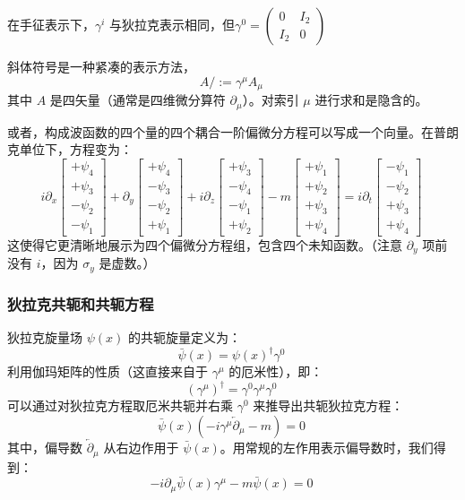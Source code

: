 在手征表示下，\( \gamma^i \) 与狄拉克表示相同，但\(\gamma^0 = \begin{pmatrix} 0 & I_2 \\ I_2 & 0 \end{pmatrix}\)

斜体符号是一种紧凑的表示方法，
\[
A\!\!\!/ := \gamma^\mu A_\mu~
\]
其中 \( A \) 是四矢量（通常是四维微分算符 \( \partial_\mu \)）。对索引 \( \mu \) 进行求和是隐含的。

或者，构成波函数的四个量的四个耦合一阶偏微分方程可以写成一个向量。在普朗克单位下，方程变为：
\[
i \partial_x \begin{bmatrix} +\psi_4 \\ +\psi_3 \\ -\psi_2 \\ -\psi_1 \end{bmatrix}
+ \partial_y \begin{bmatrix} +\psi_4 \\ -\psi_3 \\ -\psi_2 \\ +\psi_1 \end{bmatrix}
+ i \partial_z \begin{bmatrix} +\psi_3 \\ -\psi_4 \\ -\psi_1 \\ +\psi_2 \end{bmatrix}
- m \begin{bmatrix} +\psi_1 \\ +\psi_2 \\ +\psi_3 \\ +\psi_4 \end{bmatrix}
= i \partial_t \begin{bmatrix} -\psi_1 \\ -\psi_2 \\ +\psi_3 \\ +\psi_4 \end{bmatrix}~
\]
这使得它更清晰地展示为四个偏微分方程组，包含四个未知函数。（注意 \(\partial_y \) 项前没有 \( i \)，因为 \( \sigma_y \) 是虚数。）
\subsubsection{狄拉克共轭和共轭方程}

狄拉克旋量场 \( \psi(x) \) 的共轭旋量定义为：
\[
\bar{\psi}(x) = \psi(x)^\dagger \gamma^0~
\]
利用伽玛矩阵的性质（这直接来自于 \( \gamma^\mu \) 的厄米性），即：
\[
(\gamma^\mu)^\dagger = \gamma^0 \gamma^\mu \gamma^0~
\]
可以通过对狄拉克方程取厄米共轭并右乘 \( \gamma^0 \) 来推导出共轭狄拉克方程：
\[
\bar{\psi}(x)(-i \gamma^\mu {\overleftarrow \partial}_\mu - m) = 0~
\]
其中，偏导数 \( {\overleftarrow \partial}_\mu \) 从右边作用于 \( \bar{\psi}(x) \)。用常规的左作用表示偏导数时，我们得到：
\[
-i \partial_\mu \bar{\psi}(x) \gamma^\mu - m \bar{\psi}(x) = 0~
\]

